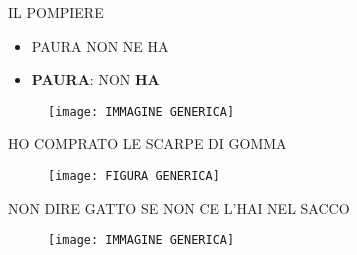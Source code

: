 \documentclass[14pt]{article}
\begin{document}


IL POMPIERE 

\begin{itemize}
	\item PAURA NON NE HA
	\item \textbf{PAURA}: NON \color{NE} \textbf{HA}
\end{itemize}

\vspace{50pt} 

\begin{figure}[H]
	\centering
	\texttt{[image: IMMAGINE GENERICA]}
\end{figure}

\pagebreak %

HO COMPRATO LE SCARPE DI GOMMA

\begin{figure}[H]
	\centering
	\texttt{[image: FIGURA GENERICA]}
\end{figure}

NON DIRE GATTO SE NON CE L'HAI NEL SACCO

\begin{figure}[H]
	\centering
	\texttt{[image: IMMAGINE GENERICA]}
\end{figure}



\label{LastPage}
\end{document}
